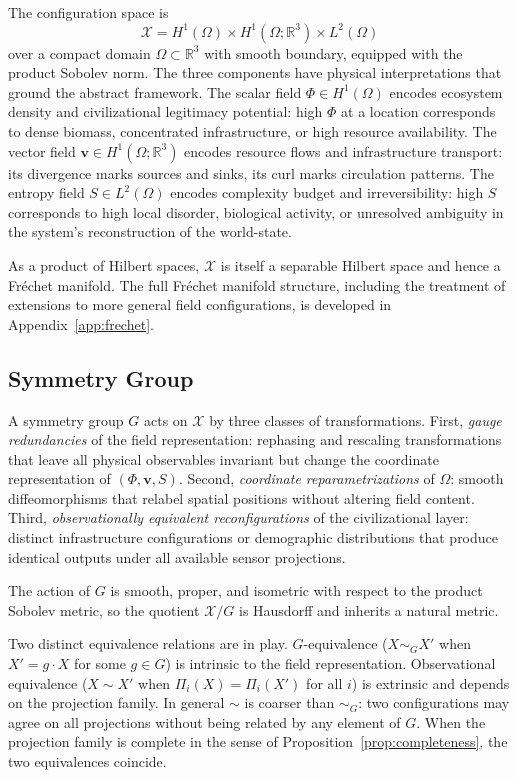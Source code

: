 \documentclass[11pt, oneside]{article}
\begin{document}
The configuration space is
\[
\mathcal{X} = H^1(\Omega) \times H^1(\Omega;\mathbb{R}^3) \times L^2(\Omega)
\]
over a compact domain $\Omega \subset \mathbb{R}^3$ with smooth boundary, equipped with
the product Sobolev norm. The three components have physical interpretations that ground
the abstract framework. The scalar field $\Phi \in H^1(\Omega)$ encodes ecosystem density
and civilizational legitimacy potential: high $\Phi$ at a location corresponds to dense
biomass, concentrated infrastructure, or high resource availability. The vector field
$\mathbf{v} \in H^1(\Omega;\mathbb{R}^3)$ encodes resource flows and infrastructure
transport: its divergence marks sources and sinks, its curl marks circulation patterns.
The entropy field $S \in L^2(\Omega)$ encodes complexity budget and irreversibility: high
$S$ corresponds to high local disorder, biological activity, or unresolved ambiguity in
the system's reconstruction of the world-state.

As a product of Hilbert spaces, $\mathcal{X}$ is itself a separable Hilbert space and
hence a Fréchet manifold. The full Fréchet manifold structure, including the treatment of
extensions to more general field configurations, is developed in
Appendix~\ref{app:frechet}.

\subsection{Symmetry Group}

A symmetry group $G$ acts on $\mathcal{X}$ by three classes of transformations. First,
\emph{gauge redundancies} of the field representation: rephasing and rescaling
transformations that leave all physical observables invariant but change the coordinate
representation of $(\Phi, \mathbf{v}, S)$. Second, \emph{coordinate reparametrizations}
of $\Omega$: smooth diffeomorphisms that relabel spatial positions without altering field
content. Third, \emph{observationally equivalent reconfigurations} of the civilizational
layer: distinct infrastructure configurations or demographic distributions that produce
identical outputs under all available sensor projections.

The action of $G$ is smooth, proper, and isometric with respect to the product Sobolev
metric, so the quotient $\mathcal{X}/G$ is Hausdorff and inherits a natural metric.

Two distinct equivalence relations are in play. $G$-equivalence ($X \sim_G X'$ when
$X' = g \cdot X$ for some $g \in G$) is intrinsic to the field representation.
Observational equivalence ($X \sim X'$ when $\Pi_i(X) = \Pi_i(X')$ for all $i$) is
extrinsic and depends on the projection family. In general $\sim$ is coarser than
$\sim_G$: two configurations may agree on all projections without being related by any
element of $G$. When the projection family is complete in the sense of
Proposition~\ref{prop:completeness}, the two equivalences coincide.
\end{document}
